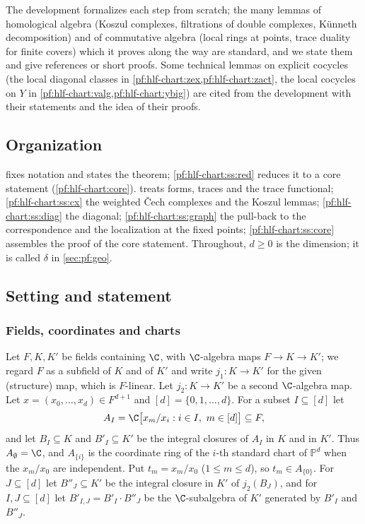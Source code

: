 The development formalizes each step from scratch; the many lemmas of homological algebra (Koszul complexes, filtrations of double complexes,
K\"unneth decomposition) and of commutative algebra (local rings at points, trace duality for finite covers) which it proves along the way are
standard, and we state them and give references or short proofs. Some technical lemmas on explicit cocycles (the local diagonal classes in
\cref{pf:hlf-chart:zex,pf:hlf-chart:zact}, the local cocycles on $Y$ in \cref{pf:hlf-chart:valg,pf:hlf-chart:ybig}) are cited from the development
\cite{LeanSource2026} with their statements and the idea of their proofs.

\subsection*{Organization}
 fixes notation and states the theorem; \cref{pf:hlf-chart:ss:red} reduces it to a core statement
(\cref{pf:hlf-chart:core}).  treats forms, traces and the trace functional; \cref{pf:hlf-chart:ss:cx}
the weighted \v{C}ech complexes and the Koszul lemmas; \cref{pf:hlf-chart:ss:diag} the diagonal; \cref{pf:hlf-chart:ss:graph} the
pull-back to the correspondence and the localization at the fixed points; \cref{pf:hlf-chart:ss:core} assembles the proof of the core
statement. Throughout, $d\ge0$ is the dimension; it is called $\delta$ in \cref{sec:pf:geo}.

\subsection{Setting and statement}\label{pf:hlf-chart:ss:setting}

\subsubsection*{Fields, coordinates and charts}
Let $F,K,K'$ be fields containing $\C$, with $\C$-algebra maps $F\to K\to K'$; we regard $F$ as a subfield of $K$ and of $K'$ and write
$j_1\colon K\to K'$ for the given (structure) map, which is $F$-linear. Let $j_2\colon K\to K'$ be a second $\C$-algebra map. Let
$x=(x_0,\dots,x_d)\in F^{d+1}$ and $[d]=\{0,1,\dots,d\}$. For a subset $I\subseteq[d]$ let
\[
  A_I=\C\bigl[x_m/x_i : i\in I,\ m\in[d]\bigr]\subseteq F,
\]
and let $B_I\subseteq K$ and $B'_I\subseteq K'$ be the integral closures of $A_I$ in $K$ and in $K'$. Thus $A_\emptyset=\C$, and
$A_{\{i\}}$ is the coordinate ring of the $i$-th standard chart of $\mathbb P^d$ when the $x_m/x_0$ are independent. Put $t_m=x_m/x_0$
($1\le m\le d$), so $t_m\in A_{\{0\}}$. For $J\subseteq[d]$ let $B''_J\subseteq K'$ be the integral closure in $K'$ of $j_2(B_J)$, and for
$I,J\subseteq[d]$ let $B'_{I,J}=B'_I\cdot B''_J$ be the $\C$-subalgebra of $K'$ generated by $B'_I$ and $B''_J$.

